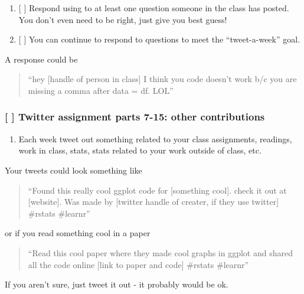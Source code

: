 \documentclass[]{article}
\providecommand{\tightlist}{%
  \setlength{\itemsep}{0pt}\setlength{\parskip}{0pt}}
\begin{document}
\begin{enumerate}
\def\labelenumi{\arabic{enumi}.}
\tightlist
\item
  {[} {]} Respond using to at least one question someone in the class
  has posted. You don't even need to be right, just give you best guess!
\item
  {[} {]} You can continue to respond to questions to meet the
  ``tweet-a-week'' goal.
\end{enumerate}

A response could be

\begin{quote}
``hey {[}handle of person in class{]} I think you code doesn't work b/c
you are missing a comma after data = df. LOL''
\end{quote}

\subsubsection{{[} {]} Twitter assignment parts 7-15: other
contributions}\label{twitter-assignment-parts-7-15-other-contributions}

\begin{enumerate}
\def\labelenumi{\arabic{enumi}.}
\tightlist
\item
  Each week tweet out something related to your class assignments,
  readings, work in class, stats, stats related to your work outside of
  class, etc.
\end{enumerate}

Your tweets could look something like

\begin{quote}
``Found this really cool ggplot code for {[}something cool{]}. check it
out at {[}website{]}. Was made by {[}twitter handle of creater, if they
use twitter{]} \#rstats \#learnr''
\end{quote}

or if you read something cool in a paper

\begin{quote}
``Read this cool paper where they made cool graphs in ggplot and shared
all the code online {[}link to paper and code{]} \#rstats \#learnr''
\end{quote}

If you aren't sure, just tweet it out - it probably would be ok.
\end{document}
